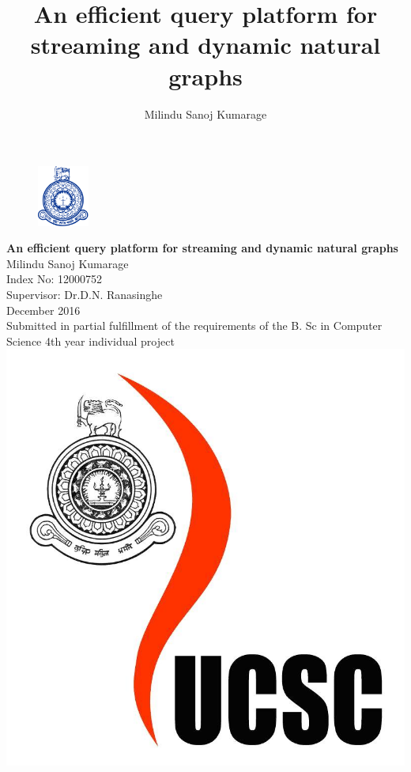 \documentclass[12pt]{report}
\title{An efficient query platform for streaming and dynamic natural graphs}
\author{Milindu Sanoj Kumarage}
\numberwithin{figure}{section}
\numberwithin{table}{section}
\begin{document}
 

\begin{titlepage}
\newcommand{\HRule}{\rule{\linewidth}{0.5mm}} %
\begin{figure}[H]
\centering
\includegraphics[height=2cm]{uoc}\\[1cm]
\end{figure}
\center 
{ \LARGE \bfseries An efficient query platform for streaming and dynamic natural graphs }\\[1.5cm]
\Large Milindu Sanoj Kumarage\\
\Large Index No: 12000752\\[1cm]
\Large Supervisor: Dr.D.N. Ranasinghe\\[1cm]
\Large December 2016\\[1.5cm]
\large Submitted in partial fulfillment of the requirements of the B. Sc in Computer Science 4th year individual project\\[0.5cm] 
\includegraphics[scale=0.06]{ucsc}
\vfill %
\end{titlepage}
\end{document}

